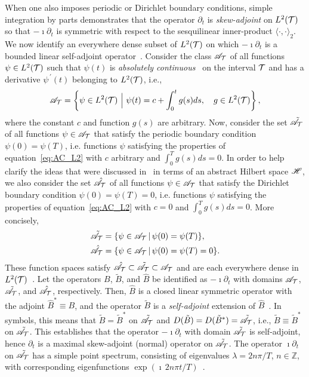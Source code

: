 \documentclass[amsa]{ipart}
\begin{document}
When one also imposes periodic or Dirichlet boundary conditions,
simple integration by parts demonstrates that the operator $\partial_t$ is
\emph{skew-adjoint} on $L^2(\mathcal{T})$ so that $-\imath\partial_t$ is symmetric with
respect to the sesquilinear inner-product $\langle\cdot,\cdot\rangle_2$. We now identify an
everywhere dense subset of $L^2(\mathcal{T})$ on which $-\imath\partial_t$ is a bounded
linear self-adjoint operator~\cite{Reed-1980,Stone:64}. Consider the
class $\mathscr{A}_{\mathcal{T}}$ of all functions $\psi\in L^2(\mathcal{T})$ such that $\psi(t)$ is
\emph{absolutely continuous}~\cite{Royden:1988:RA} on the interval
$\mathcal{T}$ and has a derivative $\psi^{\,\prime}(t)$ belonging to $L^2(\mathcal{T})$,
i.e.,~\cite{Stone:64,Royden:1988:RA}     
%
\begin{align}\label{eq:AC_L2}
  \As_{\Tc}=
     \left\{
       \psi\in L^2(\Tc) \ \Big| \ \psi(t)=c+\int_0^tg(s)ds,
       \quad  g\in L^2(\Tc)
     \right\},
\end{align}
%
where the constant $c$ and function $g(s)$ are
arbitrary. Now, consider the set $\tilde{\mathscr{A}}_{\mathcal{T}}$ of all
functions $\psi\in\mathscr{A}_{\mathcal{T}}$ that satisfy the periodic boundary condition
$\psi(0)=\psi(T)$, i.e. functions $\psi$ satisfying the properties of 
equation~\eqref{eq:AC_L2} with $c$ arbitrary and
$\int_0^Tg(s)ds=0$. In order to help clarify the ideas that were
discussed in~ in terms of an abstract  
Hilbert space $\mathscr{H}$, we also consider the set $\hat{\mathscr{A}}_{\mathcal{T}}$ of all
functions $\psi\in\mathscr{A}_{\mathcal{T}}$ that satisfy the Dirichlet boundary condition
$\psi(0)=\psi(T)=0$, i.e. functions $\psi$ satisfying the properties of
equation~\eqref{eq:AC_L2} with $c=0$ and $\int_0^Tg(s)ds=0$. More
concisely,  
%
\begin{align}\label{eq:AC_BC}
  \tilde{\As}_{\Tc}&=\{\psi\in\As_{\Tc} \,|\, \psi(0)=\psi(T)\},
  \\
  \hat{\As}_{\Tc}&=\{\psi\in\As_{\Tc} \,|\, \psi(0)=\psi(T)=0\}.
  \notag
\end{align}
%
These function spaces satisfy
$\hat{\mathscr{A}}_{\mathcal{T}}\subset\tilde{\mathscr{A}}_{\mathcal{T}}\subset\mathscr{A}_{\mathcal{T}}$ and are each everywhere
dense in $L^2(\mathcal{T})$~\cite{Stone:64}. Let the operators $B$,
$\tilde{B}$, and $\hat{B}$ be identified as $-\imath\partial_t$ with domains
$\mathscr{A}_{\mathcal{T}}$, $\tilde{\mathscr{A}}_{\mathcal{T}}$, and $\hat{\mathscr{A}}_{\mathcal{T}}$,
respectively. Then, $\hat{B}$ is a closed linear symmetric operator
with the adjoint $\hat{B}^*\equiv B$, and the operator $\tilde{B}$ is a
\emph{self-adjoint} extension of $\hat{B}$~\cite{Stone:64}. In
symbols, this means that $\tilde{B}=\tilde{B}^*$ on
$\tilde{\mathscr{A}}_{\mathcal{T}}$ and
$D(\tilde{B})=D(\tilde{B}^*)=\tilde{\mathscr{A}}_{\mathcal{T}}$,
i.e., $\tilde{B}\equiv\tilde{B}^*$ on $\tilde{\mathscr{A}}_{\mathcal{T}}$. This establishes
that the operator $-\imath\partial_t$ with domain $\tilde{\mathscr{A}}_{\mathcal{T}}$ is
self-adjoint, hence $\partial_t$ is a maximal skew-adjoint (normal)
operator on $\tilde{\mathscr{A}}_{\mathcal{T}}$. The operator $\imath\partial_t$ on
$\tilde{\mathscr{A}}_{\mathcal{T}}$ has a simple point spectrum, consisting of
eigenvalues $\lambda=2n\pi/T$, $n\in\mathbb{Z}$, with corresponding
eigenfunctions $\exp(\imath\,2n\pi t/T)$~\cite{Stone:64}.
\end{document}
